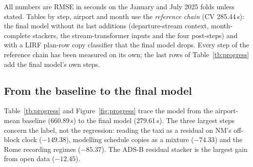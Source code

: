 \documentclass[
  manuscript=article,
  layout=preprint,
  year=2026,
  volume=x,
]{extra/joas}
\begin{document}
All numbers are RMSE in seconds on the January and July 2025 folds unless stated. Tables by step, airport and month use the
\emph{reference chain} (CV 285.44\,s): the final model without its last additions (departure-stream context, month-complete
stackers, the stream-transformer inputs and the four post-steps) and with a LIRF plan-row copy classifier that the final model drops. Every step
of the reference chain has been measured on its own; the last rows of Table~\ref{tb:progress} add the final model's own steps.

\subsection{From the baseline to the final model}

Table~\ref{tb:progress} and Figure~\ref{fig:progress} trace the model from the airport-mean baseline (660.89\,s) to the final model
(279.61\,s). The three largest steps concern the label, not the regression: reading the
taxi as a residual on NM's off-block clock ($-149.38$), modelling schedule copies as a mixture ($-74.33$) and the Rome recording regimes
($-85.37$). The ADS-B residual stacker is the largest gain from open data ($-12.45$).
\end{document}
